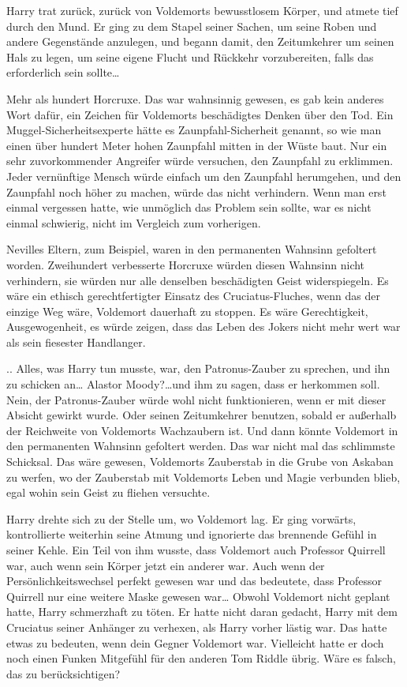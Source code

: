 {Harry trat zurück, zurück von Voldemorts bewusstlosem Körper, und atmete tief durch den Mund. Er ging zu dem Stapel seiner Sachen, um seine Roben und andere Gegenstände anzulegen, und begann damit, den Zeitumkehrer um seinen Hals zu legen, um seine eigene Flucht und Rückkehr vorzubereiten, falls das erforderlich sein sollte…

Mehr als hundert Horcruxe. Das war wahnsinnig gewesen, es gab kein anderes Wort dafür, ein Zeichen für Voldemorts beschädigtes Denken über den Tod. Ein Muggel-Sicherheitsexperte hätte es Zaunpfahl-Sicherheit genannt, so wie man einen über hundert Meter hohen Zaunpfahl mitten in der Wüste baut. Nur ein sehr zuvorkommender Angreifer würde versuchen, den Zaunpfahl zu erklimmen. Jeder vernünftige Mensch würde einfach um den Zaunpfahl herumgehen, und den Zaunpfahl noch höher zu machen, würde das nicht verhindern. Wenn man erst einmal vergessen hatte, wie unmöglich das Problem sein sollte, war es nicht einmal schwierig, nicht im Vergleich zum vorherigen.

Nevilles Eltern, zum Beispiel, waren in den permanenten Wahnsinn gefoltert worden. Zweihundert verbesserte Horcruxe würden diesen Wahnsinn nicht verhindern, sie würden nur alle denselben beschädigten Geist widerspiegeln. Es wäre ein ethisch gerechtfertigter Einsatz des Cruciatus-Fluches, wenn das der einzige Weg wäre, Voldemort dauerhaft zu stoppen. Es wäre Gerechtigkeit, Ausgewogenheit, es würde zeigen, dass das Leben des Jokers nicht mehr wert war als sein fiesester Handlanger.

.. Alles, was Harry tun musste, war, den Patronus-Zauber zu sprechen, und ihn zu schicken an… Alastor Moody?…und ihm zu sagen, dass er herkommen soll. Nein, der Patronus-Zauber würde wohl nicht funktionieren, wenn er mit dieser Absicht gewirkt wurde. Oder seinen Zeitumkehrer benutzen, sobald er außerhalb der Reichweite von Voldemorts Wachzaubern ist. Und dann könnte Voldemort in den permanenten Wahnsinn gefoltert werden. Das war nicht mal das schlimmste Schicksal. Das wäre gewesen, Voldemorts Zauberstab in die Grube von Askaban zu werfen, wo der Zauberstab mit Voldemorts Leben und Magie verbunden blieb, egal wohin sein Geist zu fliehen versuchte.

Harry drehte sich zu der Stelle um, wo Voldemort lag. Er ging vorwärts, kontrollierte weiterhin seine Atmung und ignorierte das brennende Gefühl in seiner Kehle. Ein Teil von ihm wusste, dass Voldemort auch Professor Quirrell war, auch wenn sein Körper jetzt ein anderer war. Auch wenn der Persönlichkeitswechsel perfekt gewesen war und das bedeutete, dass Professor Quirrell nur eine weitere Maske gewesen war… Obwohl Voldemort nicht geplant hatte, Harry schmerzhaft zu töten. Er hatte nicht daran gedacht, Harry mit dem Cruciatus seiner Anhänger zu verhexen, als Harry vorher lästig war. Das hatte etwas zu bedeuten, wenn dein Gegner Voldemort war. Vielleicht hatte er doch noch einen Funken Mitgefühl für den anderen Tom Riddle übrig. Wäre es falsch, das zu berücksichtigen?

}
